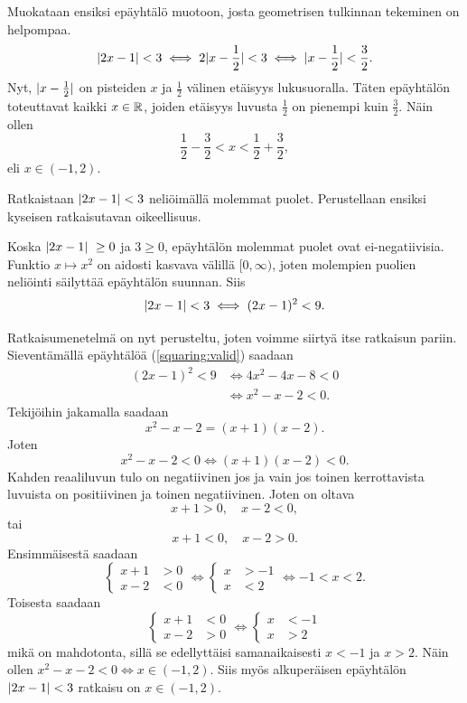 \documentclass[11pt,a4paper]{amsart}
\begin{document}
\begin{solution}
Muokataan ensiksi epäyhtälö muotoon, josta geometrisen tulkinnan tekeminen
on helpompaa.
\[\lvert2x - 1\rvert < 3 \iff 2\lvert x - \frac{1}{2}\rvert < 3 \iff \lvert x -
\frac{1}{2}\rvert < \frac{3}{2}.\]
Nyt, \(\lvert x - \frac{1}{2}\rvert\) on pisteiden \(x\) ja \(\frac{1}{2}\) välinen
etäisyys lukusuoralla. Täten epäyhtälön toteuttavat kaikki \(x \in \mathbb{R}\), joiden
etäisyys luvusta \(\frac{1}{2}\) on pienempi kuin \(\frac{3}{2}\). Näin ollen
\[\frac{1}{2} - \frac{3}{2} < x < \frac{1}{2} + \frac{3}{2},\]
eli \(x \in (-1, 2)\).

Ratkaistaan \(\lvert2x - 1\rvert < 3\) neliöimällä molemmat puolet. Perustellaan
ensiksi kyseisen ratkaisutavan oikeellisuus.

Koska \(\lvert2x - 1\rvert\ \geq 0\) ja \(3 \geq 0\), epäyhtälön molemmat puolet
ovat ei-negatiivisia. Funktio \(x \mapsto x^2\) on aidosti kasvava välillä
\([0, \infty)\), joten molempien puolien neliöinti säilyttää epäyhtälön suunnan.
Siis
\begin{equation}\label{squaring:valid}
\lvert2x - 1\rvert < 3 \iff (2x - 1)^2 < 9.
\end{equation}

Ratkaisumenetelmä on nyt perusteltu, joten voimme siirtyä itse ratkaisun pariin.
Sieventämällä epäyhtälöä (\ref{squaring:valid}) saadaan
\begin{align*}
(2x - 1)^2 < 9 &\iff 4x^2 - 4x - 8 < 0 \\
&\iff x^2 - x - 2 < 0.
\end{align*}
Tekijöihin jakamalla saadaan
\[x^2 - x - 2 = (x + 1)(x - 2).\]
Joten
\[x^2 - x - 2 < 0 \iff (x + 1)(x - 2) < 0.\]
Kahden reaaliluvun tulo on negatiivinen jos ja vain jos toinen kerrottavista
luvuista on positiivinen ja toinen negatiivinen. Joten on oltava
\[x + 1 > 0, \quad x - 2 < 0,\]
tai
\[x + 1 < 0, \quad x - 2 > 0.\]
Ensimmäisestä saadaan
\begin{equation*}
\begin{cases}
  x + 1 &> 0 \\
  x - 2 &< 0
\end{cases}
\iff
\begin{cases}
  x &> -1 \\
  x &< 2
\end{cases}
\iff -1 < x < 2.
\end{equation*}
Toisesta saadaan
\begin{equation*}
\begin{cases}
  x + 1 &< 0 \\
  x - 2 &> 0
\end{cases}
\iff
\begin{cases}
  x &< -1 \\
  x &> 2
\end{cases}
\end{equation*}
mikä on mahdotonta, sillä se edellyttäisi samanaikaisesti
\(x < -1\) ja \(x > 2\). Näin ollen \(x^2 - x - 2 < 0 \iff x \in (-1, 2)\).
Siis myös alkuperäisen epäyhtälön \(\lvert2x - 1\rvert < 3\) ratkaisu on
\(x \in (-1, 2)\).
\end{solution}
\end{document}
